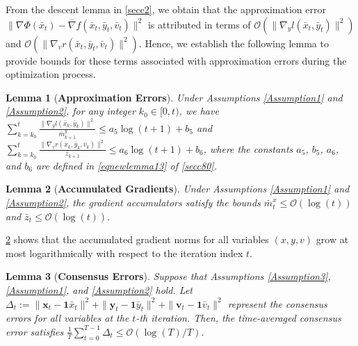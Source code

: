 \documentclass{article}
\theoremstyle{plain}
\newtheorem{lemma}[lemma]{Lemma}
\theoremstyle{definition}
\theoremstyle{remark}
\begin{document}
From the descent lemma in \cref{secc2}, we obtain that the approximation error $\|\nabla \Phi(\bar{x}_t) -\bar{\nabla} f(\bar{x}_t, \bar{y}_t, \bar{v}_t)\|^2$ is attributed in terms of $\mathcal{O}(\|\nabla_y l(\bar{x}_t, \bar{y}_t)\|^2)$ and $\mathcal{O}(\|\nabla_v r(\bar{x}_t, \bar{y}_t, \bar{v}_t)\|^2)$. Hence, we establish the following lemma to provide bounds for these terms associated with approximation errors during the optimization process.

\begin{lemma}[\textbf{Approximation Errors}] Under Assumptions \ref{Assumption1} and \ref{Assumption2}, for any integer $k_0 \in [0, t)$, we have $
\sum_{k=k_0}^t \frac{\|\nabla_y l(\bar{x}_k, \bar{y}_k)\|^2}{\bar{m}^y_{k+1}} \leq a_5 \log(t + 1) + b_5$ and
$\sum_{k=k_0}^t \frac{\|\nabla_v r(\bar{x}_k, \bar{y}_k, \bar{v}_k)\|^2}{\bar{z}_{k+1}} \leq a_6 \log(t + 1) + b_6$,
where the constants $a_5$, $b_5$, $a_6$, and $b_6$ are defined in \cref{eqnewlemma13} of \cref{secc80}.
\end{lemma}
\begin{lemma}[\textbf{Accumulated Gradients}]\label{proposition2}  
Under Assumptions \ref{Assumption1} and \ref{Assumption2}, the gradient accumulators satisfy the bounds
$\bar{m}^x_t \leq \mathcal{O}\left(\log(t)\right)$ and $\bar{z}_t \leq \mathcal{O}\left(\log(t)\right).$
\end{lemma}
\cref{proposition2} shows that the accumulated gradient norms for all variables \((x, y, v)\) grow at most logarithmically with respect to the iteration index \(t\).

\begin{lemma}[\textbf{Consensus Errors}]\label{Lemma5} Suppose that Assumptions \ref{Assumption3}, \ref{Assumption1}, and \ref{Assumption2} hold. Let \(\Delta_t := \|\mathbf{x}_t - \mathbf{1} \bar{x}_t\|^2 + \|\mathbf{y}_t - \mathbf{1} \bar{y}_t\|^2 + \|\mathbf{v}_t - \mathbf{1} \bar{v}_t\|^2\) represent the consensus errors for all variables at the \(t\)-th iteration. Then, the time-averaged consensus error satisfies $\frac{1}{T}\sum_{t=0}^{T-1} \Delta_t
\leq \mathcal{O}\left({\log(T)}/{T}\right)$.
\end{lemma}
\end{document}
